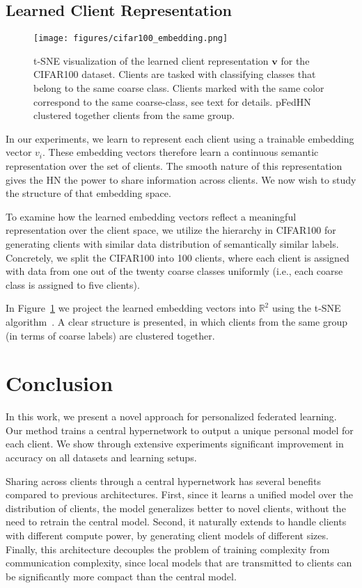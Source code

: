 \documentclass{article}
\newcommand{\bv}{\boldsymbol{v}}
\newcommand\ourmethod{pFedHN}
\begin{document}
\subsection{Learned Client Representation}

\begin{figure}[ht]
    \centering
    \texttt{[image: figures/cifar100\_embedding.png]}
    \caption{t-SNE visualization of the learned client representation $\bv$ for the CIFAR100 dataset. Clients are tasked with classifying classes that belong to the same coarse class. Clients marked with the same color correspond to the same coarse-class, see text for details. \ourmethod{} clustered together clients from the same group.}
    \label{fig:embedding}
\end{figure}
In our experiments, we learn to represent each client using a trainable embedding vector $v_i$. These embedding vectors therefore learn a continuous semantic representation over the set of clients. The smooth nature of this representation gives the HN the power to share information across clients. 
We now wish to study the structure of that embedding space.  

To examine how the learned embedding vectors reflect a meaningful representation over the client space, 
we utilize the hierarchy in CIFAR100 for generating clients with similar data distribution of semantically similar labels. Concretely, we split the CIFAR100 into 100 clients, where each client is assigned with data from one out of the twenty coarse classes uniformly (i.e., each coarse class is assigned to five clients). 

In Figure~\ref{fig:embedding} we project the learned embedding vectors into $\mathbb{R}^2$ using the t-SNE algorithm~\cite{Maaten2008VisualizingDU}. A clear structure is presented, in which clients from the same group (in terms of coarse labels) are clustered together. 

\section{Conclusion}

In this work, we present a novel approach for personalized federated learning. Our method trains a central hypernetwork to output a unique personal model for each client.
We show through extensive experiments significant improvement in accuracy on all datasets and learning setups.

Sharing across clients through a central hypernetwork has several benefits compared to previous architectures. First, since it learns a unified model over the distribution of clients, the model generalizes better to novel clients, without the need to retrain the central model. Second, it naturally extends to handle clients with different compute power, by generating client models of different sizes. 
Finally, this architecture decouples the problem of training complexity from communication complexity, since local models that are transmitted to clients can be significantly more compact than the central model.
\end{document}
